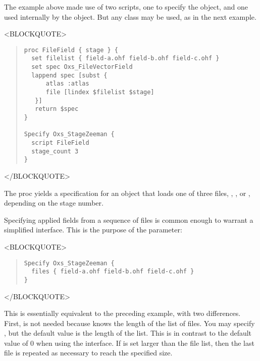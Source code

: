 \begin{itemize}
\begin{description}
   The example above made use of two scripts, one to specify the
    object, and one used internally by the
    object.  But any 
   class may be used, as in the next example.
\begin{rawhtml}<BLOCKQUOTE>\end{rawhtml}
\begin{quote}
\begin{verbatim}
proc FileField { stage } {
  set filelist { field-a.ohf field-b.ohf field-c.ohf }
  set spec Oxs_FileVectorField
  lappend spec [subst {
      atlas :atlas
      file [lindex $filelist $stage]
   }]
   return $spec
}

Specify Oxs_StageZeeman {
  script FileField
  stage_count 3
}
\end{verbatim}
\end{quote}
\begin{rawhtml}</BLOCKQUOTE>\end{rawhtml}
   The  proc yields a specification for an
    object that loads one of three files,
   , , or , depending on
   the stage number.

   Specifying applied fields from a sequence of files is common enough
   to warrant a simplified interface.  This is the purpose of the
    parameter:
\begin{rawhtml}<BLOCKQUOTE>\end{rawhtml}
\begin{quote}
\begin{verbatim}
Specify Oxs_StageZeeman {
  files { field-a.ohf field-b.ohf field-c.ohf }
}
\end{verbatim}
\end{quote}
\begin{rawhtml}</BLOCKQUOTE>\end{rawhtml}
   This is essentially equivalent to the preceding example, with two
   differences.  First,  is not needed because
    knows the length of the list of files.  You may
   specify , but the default value is the length of the
    list.  This is in contrast to the default value
   of 0 when using the  interface.  If  is
   set larger than the file list, then the last file is repeated as
   necessary to reach the specified size.


\end{description}
\end{itemize}
